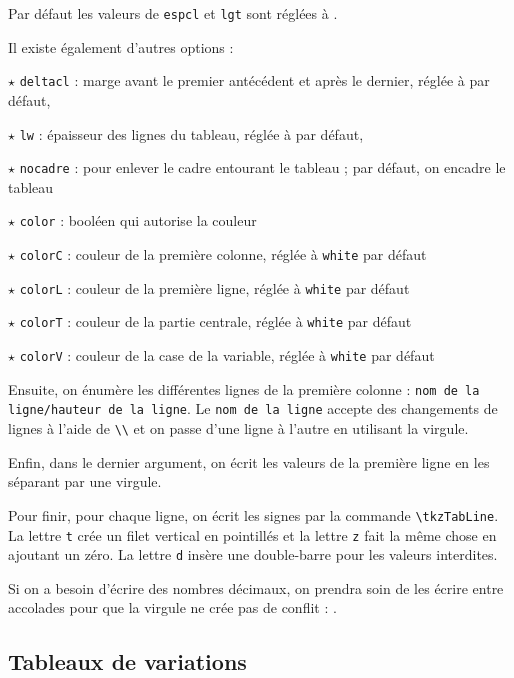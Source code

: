  Par défaut les valeurs de \verb!espcl! et \verb!lgt! sont réglées à .
 
 Il existe également d'autres options :
 
$\star$ \verb!deltacl! : marge avant le premier antécédent et après le dernier, réglée à  par défaut,

$\star$ \verb!lw! : épaisseur des lignes du tableau, réglée à  par défaut,

$\star$ \verb!nocadre! : pour enlever le cadre entourant le tableau ; par défaut, on encadre le tableau

$\star$ \verb!color! : booléen qui autorise la couleur

$\star$ \verb!colorC! : couleur de la première colonne, réglée à \texttt{white} par défaut

$\star$ \verb!colorL! : couleur de la première ligne, réglée à \texttt{white} par défaut

$\star$ \verb!colorT! : couleur de la partie centrale, réglée à \texttt{white} par défaut

$\star$ \verb!colorV! : couleur de la case de la variable, réglée à \texttt{white} par défaut

 Ensuite, on énumère les différentes lignes de la première colonne : \texttt{nom de la ligne}\verb!/!\texttt{hauteur de la ligne}. Le \texttt{nom de la ligne} accepte des changements de lignes à l'aide de \verb!\\! et on passe d'une ligne à l'autre en utilisant la virgule.

 Enfin, dans le dernier argument, on écrit les valeurs de la première ligne en les séparant par une virgule.\medskip

 Pour finir, pour chaque ligne, on écrit les signes par la commande \texttt{\textbackslash tkzTabLine}. La lettre \verb!t! crée un filet vertical en pointillés et la lettre \verb!z! fait la même chose en ajoutant un zéro. La lettre \verb!d! insère une double-barre pour les valeurs interdites.

 \begin{info}
    Si on a besoin d'écrire des nombres décimaux, on prendra soin de les écrire entre accolades pour que la virgule ne crée pas de conflit : .
 \end{info}

 \subsection{Tableaux de variations}

